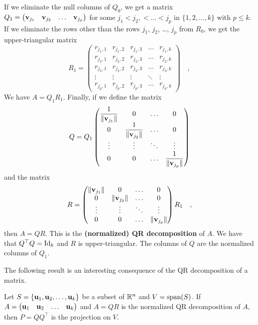 If we eliminate the null columns of $Q_0$, we get a  matrix
$Q_1 = \begin{pmatrix} \mathbf{v}_{j_1} & \mathbf{v}_{j_2} & \ldots &
  \mathbf{v}_{j_p} \end{pmatrix}$ for some $j_1 < j_2, < \ldots < j_p$ in
$\{1,2,\ldots, k\}$ with $p \leq k$.   If we eliminate the rows other
than the rows $j_1$, $j_2$, \ldots, $j_p$ from $R_0$, we get the
 upper-triangular matrix
\[
R_1 =
\begin{pmatrix}
r_{j_1,1} & r_{j_1,2} & r_{j_1,3} & \ldots & r_{j_1,k} \\
r_{j_2,1} & r_{j_2,2} & r_{j_2,3} & \ldots & r_{j_2,k} \\
r_{j_3,1} & r_{j_3,2} & r_{j_3,3} & \ldots & r_{j_3,k} \\
\vdots & \vdots & \vdots & \ddots & \vdots \\
r_{j_p,1} & r_{j_p,2} & r_{j_p,3} & \ldots & r_{j_p,k}
\end{pmatrix} \quad ,
\]
We have $A = Q_1 R_1$.  Finally, if we define the  matrix
\[
Q = Q_1 \begin{pmatrix}
\displaystyle \frac{1}{\|\mathbf{v}_{j_1}\|} & 0 & \ldots & 0 \\
0 & \displaystyle \frac{1}{\|\mathbf{v}_{j_2}\|} &\ldots & 0 \\
\vdots & \vdots & \ddots & \vdots \\
0 & 0 & \ldots & \displaystyle \frac{1}{\|\mathbf{v}_{j_p}\|}
\end{pmatrix}
\]
and the  matrix
\[
R = \begin{pmatrix}
\|\mathbf{v}_{j_1}\| & 0 & \ldots & 0 \\
0 & \|\mathbf{v}_{j_2}\| &\ldots & 0 \\
\vdots & \vdots & \ddots & \vdots \\
0 & 0 & \ldots & \|\mathbf{v}_{j_p}\|
\end{pmatrix} R_1 \quad ,
\]
then $A = QR$.  This is the
{\bfseries (normalized) QR decomposition}
of $A$.  We have that $Q^\top Q = \operatorname{Id}_k$ and $R$ is upper-triangular.
The columns of $Q$ are the normalized columns of $Q_1$.

The following result is an interesting consequence of the QR
decomposition of a matrix.

\begin{prop}
Let $S = \{\mathbf{u}_1, \mathbf{u}_2, \ldots, \mathbf{u}_k\}$ be a subset of
$\mathbb{R}^n$ and $V = \operatorname{span}(S)$.  If
$A = \begin{pmatrix} \mathbf{u}_1 & \mathbf{u}_2 & \ldots & \mathbf{u}_k\end{pmatrix}$
and $A = QR$ is the normalized QR decomposition of $A$, then
$P = Q Q^\top$ is the projection on $V$.
\end{prop}

